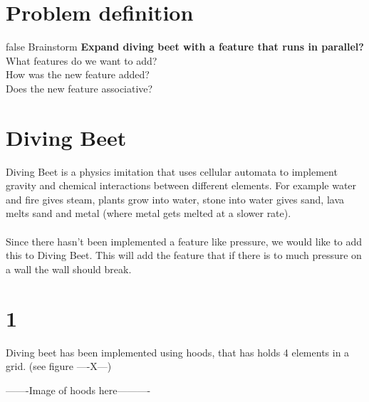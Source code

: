 \documentclass[11pt]{report}
\begin{document}
\pagestyle{fancy}
\setlength{\parindent}{0pt}



\section{Problem definition}
\if false \then  
Brainstorm
\else
\textbf{Expand diving beet with a feature that runs in parallel?}\\
What features do we want to add?\\
How was the new feature added?\\
Does the new feature associative?\\

\section{Diving Beet}
Diving Beet is a physics imitation that uses cellular automata to implement gravity and chemical interactions between different elements. For example water and fire gives steam, plants grow into water, stone into water gives sand, lava melts sand and metal (where metal gets melted at a slower rate).\\
\\
Since there hasn't been implemented a feature like pressure, we would like to add this to Diving Beet.
This will add the feature that if there is to much pressure on a wall the wall should break.

\section{1}
Diving beet has been implemented using hoods, that has holds 4 elements in a grid. (see figure ----X---)

-------Image of hoods here----------
\end{document}
